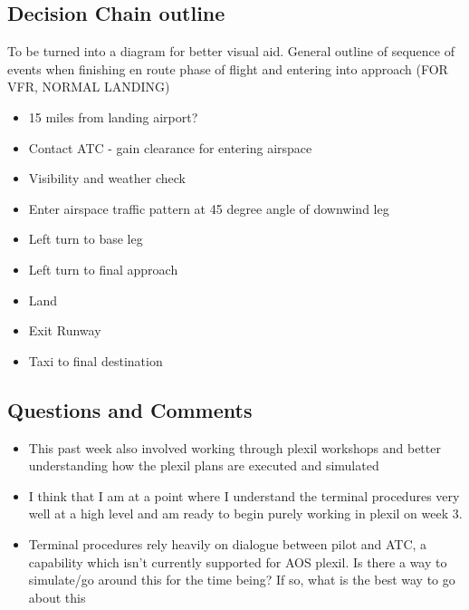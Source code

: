 \documentclass{article}
\begin{document}
\subsection{Decision Chain outline}

To be turned into a diagram for better visual aid.  General outline of sequence of events when finishing en route phase of flight and entering into approach (FOR VFR, NORMAL LANDING)

\begin{itemize}
\item 15 miles from landing airport?
\item Contact ATC - gain clearance for entering airspace
\item Visibility and weather check
\item Enter airspace traffic pattern at 45 degree angle of downwind leg
\item Left turn to base leg
\item Left turn to final approach
\item Land
\item Exit Runway
\item Taxi to final destination

\end{itemize}

\subsection{Questions and Comments}

\begin{itemize}
\item This past week also involved working through plexil workshops and better understanding how the plexil plans are executed and simulated
\item I think that I am at a point where I understand the terminal procedures very well at a high level and am ready to begin purely working in plexil on week 3.  
\item Terminal procedures rely heavily on dialogue between pilot and ATC, a capability which isn't currently supported for AOS plexil.  Is there a way to simulate/go around this for the time being?  If so, what is the best way to go about this
 
\end{itemize}
\end{document}
